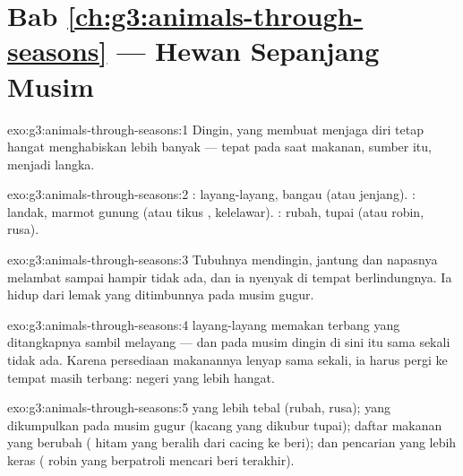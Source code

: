 \section*{Bab \ref{ch:g3:animals-through-seasons} --- Hewan Sepanjang Musim}

\begin{solution}{exo:g3:animals-through-seasons:1}
Dingin, yang membuat menjaga diri tetap hangat menghabiskan lebih
banyak  --- tepat pada saat makanan, sumber  itu, menjadi
langka.
\end{solution}

\begin{solution}{exo:g3:animals-through-seasons:2}
:  layang-layang, bangau (atau  jenjang).
: landak, marmot gunung (atau tikus , kelelawar).
: rubah, tupai (atau  robin, rusa).
\end{solution}

\begin{solution}{exo:g3:animals-through-seasons:3}
Tubuhnya mendingin, jantung dan napasnya melambat sampai hampir tidak
ada, dan ia  nyenyak di tempat berlindungnya. Ia hidup dari lemak
yang ditimbunnya pada musim gugur.
\end{solution}

\begin{solution}{exo:g3:animals-through-seasons:4}
 layang-layang memakan  terbang yang ditangkapnya sambil
melayang --- dan pada musim dingin di sini  itu sama sekali
tidak ada. Karena persediaan makanannya lenyap sama sekali, ia harus
pergi ke tempat  masih terbang: negeri yang lebih hangat.
\end{solution}

\begin{solution}{exo:g3:animals-through-seasons:5}
 yang lebih tebal (rubah, rusa); 
yang dikumpulkan pada musim gugur (kacang yang dikubur tupai); daftar
makanan yang berubah ( hitam yang beralih dari cacing ke 
beri); dan pencarian yang lebih keras ( robin yang berpatroli
mencari  beri terakhir).
\end{solution}

